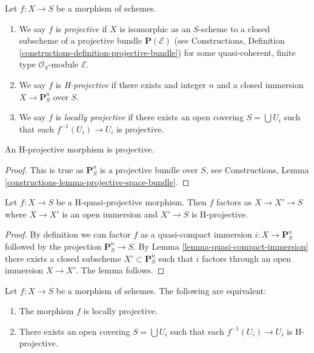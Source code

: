 \begin{definition}
\label{definition-projective}
Let $f : X \to S$ be a morphism of schemes.
\begin{enumerate}
\item We say $f$ is {\it projective} if $X$ is isomorphic as
an $S$-scheme to a closed subscheme of a projective
bundle $\mathbf{P}(\mathcal{E})$ (see
Constructions, Definition \ref{constructions-definition-projective-bundle})
for some quasi-coherent, finite type $\mathcal{O}_S$-module $\mathcal{E}$.
\item We say $f$ is {\it H-projective} if there exists and integer $n$ and
a closed immersion $X \to \mathbf{P}^n_S$ over $S$.
\item We say $f$ is {\it locally projective} if there exists an open
covering $S = \bigcup U_i$ such that each $f^{-1}(U_i) \to U_i$ is
projective.
\end{enumerate}
\end{definition}

\begin{lemma}
\label{lemma-H-projective}
An H-projective morphism is projective.
\end{lemma}

\begin{proof}
This is true as $\mathbf{P}^n_S$ is a projective bundle over $S$, see
Constructions, Lemma \ref{constructions-lemma-projective-space-bundle}.
\end{proof}

\begin{lemma}
\label{lemma-H-quasi-projective-open-H-projective}
Let $f : X \to S$ be a H-quasi-projective morphism.
Then $f$ factors as $X \to X' \to S$ where $X \to X'$ is an
open immersion and $X' \to S$ is H-projective.
\end{lemma}

\begin{proof}
By definition we can factor $f$ as a quasi-compact immersion
$i : X \to \mathbf{P}^n_S$ followed by the projection $\mathbf{P}^n_S \to S$.
By Lemma \ref{lemma-quasi-compact-immersion} there exists a closed
subscheme $X' \subset \mathbf{P}^n_S$ such that $i$ factors through
an open immersion $X \to X'$. The lemma follows.
\end{proof}

\begin{lemma}
\label{lemma-characterize-locally-projective}
Let $f : X \to S$ be a morphism of schemes.
The following are equivalent:
\begin{enumerate}
\item The morphism $f$ is locally projective.
\item There exists an open covering $S = \bigcup U_i$ such
that each $f^{-1}(U_i) \to U_i$ is H-projective.
\end{enumerate}
\end{lemma}

